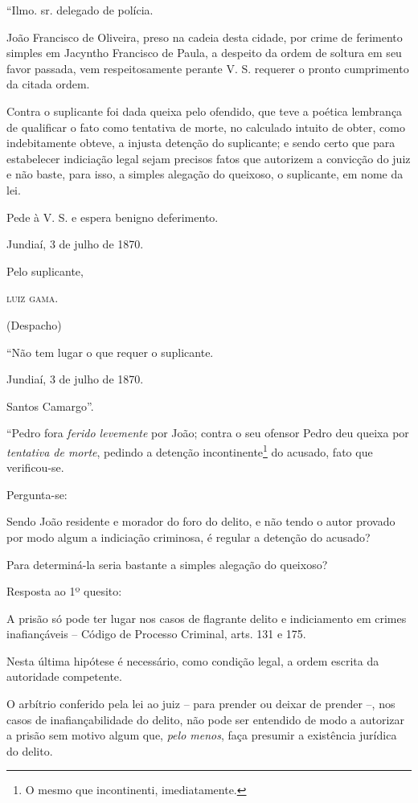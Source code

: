 \asterisc{}

``Ilmo. sr. delegado de polícia.

João Francisco de Oliveira, preso na cadeia desta cidade, por crime de
ferimento simples em Jacyntho Francisco de Paula, a despeito da ordem de
soltura em seu favor passada, vem respeitosamente perante V. S. requerer
o pronto cumprimento da citada ordem.

Contra o suplicante foi dada queixa pelo ofendido, que teve a poética
lembrança de qualificar o fato como tentativa de morte, no calculado
intuito de obter, como indebitamente obteve, a injusta detenção do
suplicante; e sendo certo que para estabelecer indiciação legal sejam
precisos fatos que autorizem a convicção do juiz e não baste, para isso,
a simples alegação do queixoso, o suplicante, em nome da lei.

Pede à V. S. e espera benigno deferimento.
\begin{flushright}
Jundiaí, 3 de julho de 1870.

Pelo suplicante,

\textsc{luiz gama}.
\end{flushright}
(Despacho)

``Não tem lugar o que requer o suplicante.

Jundiaí, 3 de julho de 1870.

Santos Camargo''.

\asterisc{}

``Pedro fora \emph{ferido levemente} por João; contra o seu ofensor Pedro
deu queixa por \emph{tentativa de morte}, pedindo a detenção
incontinente\footnote{ O mesmo que incontinenti, imediatamente.} do
acusado, fato que verificou-se.

Pergunta-se:

Sendo João residente e morador do foro do delito, e não tendo o autor
provado por modo algum a indiciação criminosa, é regular a detenção do
acusado?

Para determiná-la seria bastante a simples alegação do queixoso?

Resposta ao 1º quesito:

A prisão só pode ter lugar nos casos de flagrante delito e indiciamento
em crimes inafiançáveis -- Código de Processo Criminal, arts. 131 e 175.

Nesta última hipótese é necessário, como condição legal, a ordem escrita
da autoridade competente.

O arbítrio conferido pela lei ao juiz -- para prender ou deixar de
prender --, nos casos de inafiançabilidade do delito, não pode ser
entendido de modo a autorizar a prisão sem motivo algum que, \emph{pelo
menos}, faça presumir a existência jurídica do delito.

